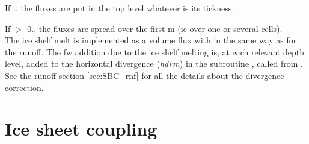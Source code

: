 \documentclass[../tex_main/NEMO_manual]{subfiles}
\begin{document}
If ., the fluxes are put in the top level whatever is its tickness. 

If  $>$ 0., the fluxes are spread over the first  m
(ie over one or several cells).\\

The ice shelf melt is implemented as a volume flux with in the same way as for the runoff.
The fw addition due to the ice shelf melting is, at each relevant depth level, added to
the horizontal divergence (\textit{hdivn}) in the subroutine , called from .
See the runoff section \autoref{sec:SBC_rnf} for all the details about the divergence correction.


\section{Ice sheet coupling}
\label{sec:SBC_iscpl}
\end{document}
